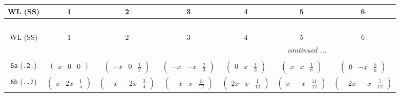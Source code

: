 \documentclass[fleqn,9pt,landscape]{jsarticle}
\begin{document}
\begin{center}
\renewcommand{\arraystretch}{1.2}
\begin{longtable}{ccccccc}
 \hline \hline
WL (SS) & 1 & 2 & 3 & 4 & 5 & 6 \\ \hline \endfirsthead

\multicolumn{6}{l}{\tablename\ \thetable{}} \\
 \hline \hline
WL (SS) & 1 & 2 & 3 & 4 & 5 & 6 \\ \hline \endhead

 \hline \hline
\multicolumn{6}{r}{\footnotesize\it continued ...} \\ \endfoot

 \hline \hline
\multicolumn{6}{r}{} \\ \endlastfoot

{\tt 6a} ({\tt .2.}) & $ \begin{pmatrix} x & 0 & 0 \end{pmatrix} $ & $ \begin{pmatrix} - x & 0 & \frac{1}{2} \end{pmatrix} $ & $ \begin{pmatrix} - x & - x & \frac{2}{3} \end{pmatrix} $ & $ \begin{pmatrix} 0 & x & \frac{1}{3} \end{pmatrix} $ & $ \begin{pmatrix} x & x & \frac{1}{6} \end{pmatrix} $ & $ \begin{pmatrix} 0 & - x & \frac{5}{6} \end{pmatrix} $ \\ \hline
{\tt 6b} ({\tt ..2}) & $ \begin{pmatrix} x & 2 x & \frac{1}{4} \end{pmatrix} $ & $ \begin{pmatrix} - x & - 2 x & \frac{3}{4} \end{pmatrix} $ & $ \begin{pmatrix} - x & x & \frac{5}{12} \end{pmatrix} $ & $ \begin{pmatrix} 2 x & x & \frac{1}{12} \end{pmatrix} $ & $ \begin{pmatrix} x & - x & \frac{11}{12} \end{pmatrix} $ & $ \begin{pmatrix} - 2 x & - x & \frac{7}{12} \end{pmatrix} $ \\ \hline

\end{longtable}
\end{center}
\end{document}

